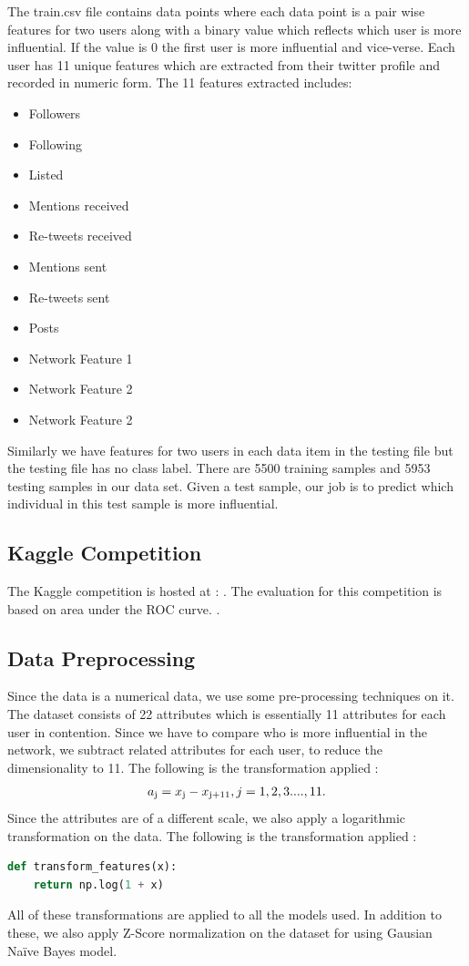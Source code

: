 \documentclass[conference]{IEEEtran}
\numberwithin{equation}{section}
\numberwithin{figure}{section}
\numberwithin{table}{section}
\begin{document}
The train.csv file contains data points where each data point is a pair wise features for two users along with a binary value which reflects which user is more influential. If the value is 0 the first user is more influential and vice-verse. Each user has 11 unique features which are extracted from their twitter profile and recorded in numeric form. The 11 features extracted includes:

\begin{itemize}
  \item Followers
  \item Following
  \item Listed
  \item Mentions received
  \item Re-tweets received
  \item Mentions sent
  \item Re-tweets sent
  \item Posts
  \item Network Feature 1
  \item Network Feature 2
  \item Network Feature 2
\end{itemize}

Similarly we have features for two users in each data item in the testing file but the testing file has no class label. There are 5500 training samples and 5953 testing samples in our data set. Given a test sample, our job is to predict which individual in this test sample is more influential.

\subsection{Kaggle Competition}
The Kaggle competition is hosted at : \cite{kaggle2}. The evaluation for this competition is based on area under the ROC curve. \cite{roc}.

\subsection{Data Preprocessing
}\label{sec:formatting-text}
Since the data is a numerical data, we use some pre-processing techniques on it. The dataset consists of 22 attributes which is essentially 11 attributes for each user in contention. Since we have to compare who is more influential in the network, we subtract related attributes for each user, to reduce the dimensionality to 11. The following is the transformation applied : 
\begin{align*}
a\textsubscript{j} = x\textsubscript{j} - x\textsubscript{j+11}, j = 1,2,3 .... , 11. 
\end{align*}
Since the attributes are of a different scale, we also apply a logarithmic transformation on the data. The following is the transformation applied :
\begin{lstlisting}[language=Python, caption = Log Transformation ]
def transform_features(x):
    return np.log(1 + x)
\end{lstlisting}
All of these transformations are applied to all the models used. In addition to these, we also apply Z-Score normalization on the dataset for using Gausian Na{\"i}ve Bayes model.
\end{document}
